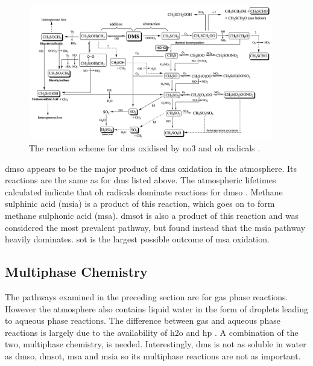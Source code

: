 	\begin{figure}[!htb]
	 	\centering
	    \includegraphics[width=0.95\textwidth,natwidth=1924,natheight=1068]{Fig/dms_Pathway.png}
	    \caption{The reaction scheme for \gls{dms} oxidised by \gls{no3} and \gls{oh} radicals \citep{barnes:2006ug}.}
	    \label{fig:dmspath}
	\end{figure}

	\gls{dmso} appears to be the major product of \gls{dms} oxidation in the atmosphere. Its reactions are the same as for \gls{dms} listed above. The atmospheric lifetimes calculated indicate that \gls{oh} radicals dominate reactions for \gls{dmso} \citep{barnes:2006ug}. Methane sulphinic acid (\gls{msia}) is a product of this reaction, which goes on to form methane sulphonic acid (\gls{msa}). \gls{dmsot} is also a product of this reaction and was considered the most prevalent pathway, but \citet{barnes:2006ug} found instead that the \gls{msia} pathway heavily dominates. \gls{sot} is the largest possible outcome of \gls{msa} oxidation.

	\subsection{Multiphase Chemistry}
	\label{subsec:multchem}

	The pathways examined in the preceding section are for gas phase reactions. However the atmosphere also contains liquid water in the form of droplets leading to aqueous phase reactions. The difference between gas and aqueous phase reactions is largely due to the availability of \gls{h2o} and \gls{hp} \citep{barnes:2006ug}. A combination of the two, multiphase chemistry, is needed. Interestingly, \gls{dms} is not as soluble in water as \gls{dmso}, \gls{dmsot}, \gls{msa} and \gls{msia} so its multiphase reactions are not as important.

